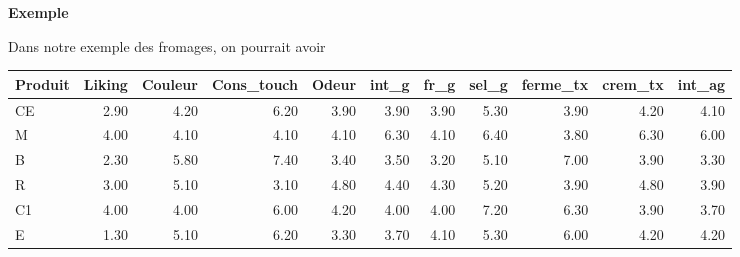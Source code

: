 \documentclass[aspectratio=169,xcolor=dvipsnames]{beamer}
\begin{document}
\begin{frame}
	\begin{exampleblock}{\textbf{Exemple}}
	\begin{scriptsize}
	Dans notre exemple des fromages, on pourrait avoir
	\begin{center}
\begin{tabular}{lrrrrrrrrrr}
  \hline
Produit & Liking & Couleur & Cons\_touch & Odeur & int\_g & fr\_g & sel\_g & ferme\_tx & crem\_tx & int\_ag \\ 
  \hline
CE & 2.90 & 4.20 & 6.20 & 3.90 & 3.90 & 3.90 & 5.30 & 3.90 & 4.20 & 4.10 \\ 
M & 4.00 & 4.10 & 4.10 & 4.10 & 6.30 & 4.10 & 6.40 & 3.80 & 6.30 & 6.00 \\ 
B & 2.30 & 5.80 & 7.40 & 3.40 & 3.50 & 3.20 & 5.10 & 7.00 & 3.90 & 3.30 \\ 
R & 3.00 & 5.10 & 3.10 & 4.80 & 4.40 & 4.30 & 5.20 & 3.90 & 4.80 & 3.90 \\ 
C1 & 4.00 & 4.00 & 6.00 & 4.20 & 4.00 & 4.00 & 7.20 & 6.30 & 3.90 & 3.70 \\ 
E & 1.30 & 5.10 & 6.20 & 3.30 & 3.70 & 4.10 & 5.30 & 6.00 & 4.20 & 4.20 \\ 
   \hline
\end{tabular}
	\end{center}
	\end{scriptsize}
	\end{exampleblock}
\end{frame}
\end{document}
